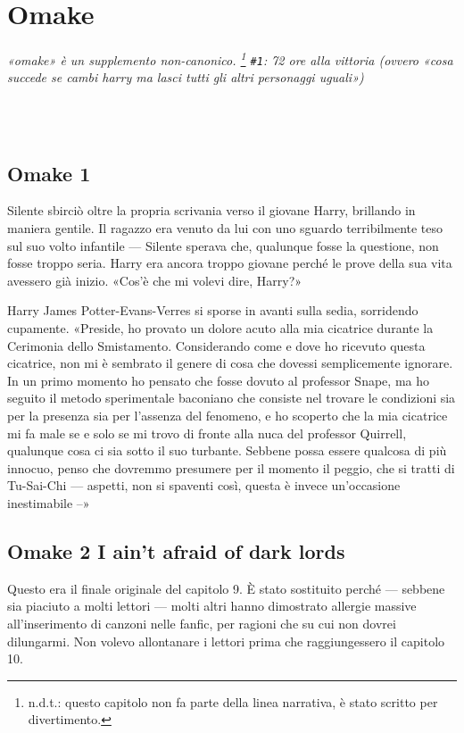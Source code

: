 
\chapter{Omake}
\label{capitolo:11}

\emph{«omake» è un supplemento non-canonico. \footnote{n.d.t.: questo capitolo non fa parte della linea narrativa, è stato scritto per divertimento.} \texttt{\#1}: 72 ore alla vittoria (ovvero «cosa succede se cambi harry ma lasci tutti gli altri personaggi uguali»)}

~\\
~\\

\section{Omake 1}

Silente sbirciò oltre la propria scrivania verso il giovane Harry, brillando in maniera gentile. Il ragazzo era venuto da lui con uno sguardo terribilmente teso sul suo volto infantile — Silente sperava che, qualunque fosse la questione, non fosse troppo seria. Harry era ancora troppo giovane perché le prove della sua vita avessero già inizio. «Cos’è che mi volevi dire, Harry?»

Harry James Potter-Evans-Verres si sporse in avanti sulla sedia, sorridendo cupamente. «Preside, ho provato un dolore acuto alla mia cicatrice durante la Cerimonia dello Smistamento. Considerando come e dove ho ricevuto questa cicatrice, non mi è sembrato il genere di cosa che dovessi semplicemente ignorare. In un primo momento ho pensato che fosse dovuto al professor Snape, ma ho seguito il metodo sperimentale baconiano che consiste nel trovare le condizioni sia per la presenza sia per l’assenza del fenomeno, e ho scoperto che la mia cicatrice mi fa male se e solo se mi trovo di fronte alla nuca del professor Quirrell, qualunque cosa ci sia sotto il suo turbante. Sebbene possa essere qualcosa di più innocuo, penso che dovremmo presumere per il momento il peggio, che si tratti di Tu-Sai-Chi — aspetti, non si spaventi così, questa è invece un’occasione inestimabile –»


\section{Omake 2 I ain’t afraid of dark lords}

Questo era il finale originale del capitolo 9. È stato sostituito perché — sebbene sia piaciuto a molti lettori — molti altri hanno dimostrato allergie massive all’inserimento di canzoni nelle fanfic, per ragioni che su cui non dovrei dilungarmi. Non volevo allontanare i lettori prima che raggiungessero il capitolo 10.

